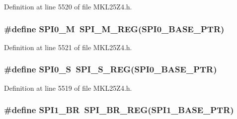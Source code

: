 Definition at line 5520 of file M\+K\+L25\+Z4.\+h.

\subsubsection[{\texorpdfstring{S\+P\+I0\+\_\+M}{SPI0_M}}]{\setlength{\rightskip}{0pt plus 5cm}\#define S\+P\+I0\+\_\+M~{\bf S\+P\+I\+\_\+\+M\+\_\+\+R\+EG}({\bf S\+P\+I0\+\_\+\+B\+A\+S\+E\+\_\+\+P\+TR})}\hypertarget{group___s_p_i___register___accessor___macros_ga31ba6745e1d0fb140bde025cb268eed3}{}\label{group___s_p_i___register___accessor___macros_ga31ba6745e1d0fb140bde025cb268eed3}


Definition at line 5521 of file M\+K\+L25\+Z4.\+h.

\subsubsection[{\texorpdfstring{S\+P\+I0\+\_\+S}{SPI0_S}}]{\setlength{\rightskip}{0pt plus 5cm}\#define S\+P\+I0\+\_\+S~{\bf S\+P\+I\+\_\+\+S\+\_\+\+R\+EG}({\bf S\+P\+I0\+\_\+\+B\+A\+S\+E\+\_\+\+P\+TR})}\hypertarget{group___s_p_i___register___accessor___macros_gad5488a8010eb834c3a7fb9d5aaf68625}{}\label{group___s_p_i___register___accessor___macros_gad5488a8010eb834c3a7fb9d5aaf68625}


Definition at line 5519 of file M\+K\+L25\+Z4.\+h.

\subsubsection[{\texorpdfstring{S\+P\+I1\+\_\+\+BR}{SPI1_BR}}]{\setlength{\rightskip}{0pt plus 5cm}\#define S\+P\+I1\+\_\+\+BR~{\bf S\+P\+I\+\_\+\+B\+R\+\_\+\+R\+EG}({\bf S\+P\+I1\+\_\+\+B\+A\+S\+E\+\_\+\+P\+TR})}\hypertarget{group___s_p_i___register___accessor___macros_ga944c7904356c8eb8f0cde2ab94095ebe}{}\label{group___s_p_i___register___accessor___macros_ga944c7904356c8eb8f0cde2ab94095ebe}


